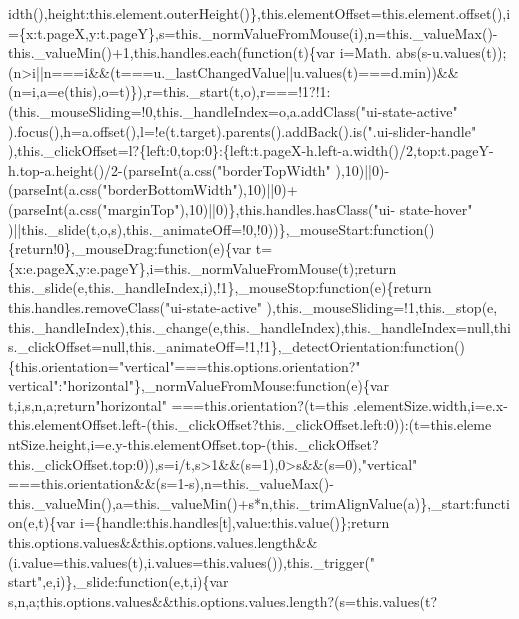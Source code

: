 \begin{DoxyCode}
{{      idth(),height:this.element.outerHeight()\},this.elementOffset=this.element.offset(),i=\{x:t.pageX,y:t.pageY\},s=this.\_normValueFromMouse(i),n=this.\_valueMax()-this.\_valueMin()+1,this.handles.each(function(t)\{var
       i=Math.
      abs(s-u.values(t));(n>i||n===i&&(t===u.\_lastChangedValue||u.values(t)===d.min))&&(n=i,a=e(this),o=t)\}),r=this.\_start(t,o),r===!1?!1:(this.\_mouseSliding=!0,this.\_handleIndex=o,a.addClass("}ui-state-active\textcolor{stringliteral}{"
      ).focus(),h=a.offset(),l=!e(t.target).parents().addBack().is("}.ui-slider-handle\textcolor{stringliteral}{"
      ),this.\_clickOffset=l?\{left:0,top:0\}:\{left:t.pageX-h.left-a.width()/2,top:t.pageY-h.top-a.height()/2-(parseInt(a.css("}borderTopWidth\textcolor{stringliteral}{"
      ),10)||0)-(parseInt(a.css("}borderBottomWidth\textcolor{stringliteral}{"),10)||0)+(parseInt(a.css("}marginTop\textcolor{stringliteral}{"),10)||0)\},this.handles.hasClass("}ui-
      state-hover\textcolor{stringliteral}{"
      )||this.\_slide(t,o,s),this.\_animateOff=!0,!0))\},\_mouseStart:function()\{return!0\},\_mouseDrag:function(e)\{var t=\{x:e.pageX,y:e.pageY\},i=this.\_normValueFromMouse(t);return
       this.\_slide(e,this.\_handleIndex,i),!1\},\_mouseStop:function(e)\{return this.handles.removeClass("}ui-state-active\textcolor{stringliteral}{"
      ),this.\_mouseSliding=!1,this.\_stop(e,
      this.\_handleIndex),this.\_change(e,this.\_handleIndex),this.\_handleIndex=null,this.\_clickOffset=null,this.\_animateOff=!1,!1\},\_detectOrientation:function()\{this.orientation="}vertical\textcolor{stringliteral}{"===this.options.orientation?"}
      vertical\textcolor{stringliteral}{":"}horizontal\textcolor{stringliteral}{"\},\_normValueFromMouse:function(e)\{var t,i,s,n,a;return"}horizontal\textcolor{stringliteral}{"
      ===this.orientation?(t=this
      .elementSize.width,i=e.x-this.elementOffset.left-(this.\_clickOffset?this.\_clickOffset.left:0)):(t=this.eleme
      ntSize.height,i=e.y-this.elementOffset.top-(this.\_clickOffset?this.\_clickOffset.top:0)),s=i/t,s>1&&(s=1),0>s&&(s=0),"}vertical\textcolor{stringliteral}{"
      ===this.orientation&&(s=1-s),n=this.\_valueMax()-this.\_valueMin(),a=this.\_valueMin()+s*n,this.\_trimAlignValue(a)\},\_start:function(e,t)\{var i=\{handle:this.handles[t],value:this.value()\};return
       this.options.values&&this.options.values.length&&(i.value=this.values(t),i.values=this.values()),this.\_trigger("}
      start\textcolor{stringliteral}{",e,i)\},\_slide:function(e,t,i)\{var
       s,n,a;this.options.values&&this.options.values.length?(s=this.values(t?
}}
\end{DoxyCode}
